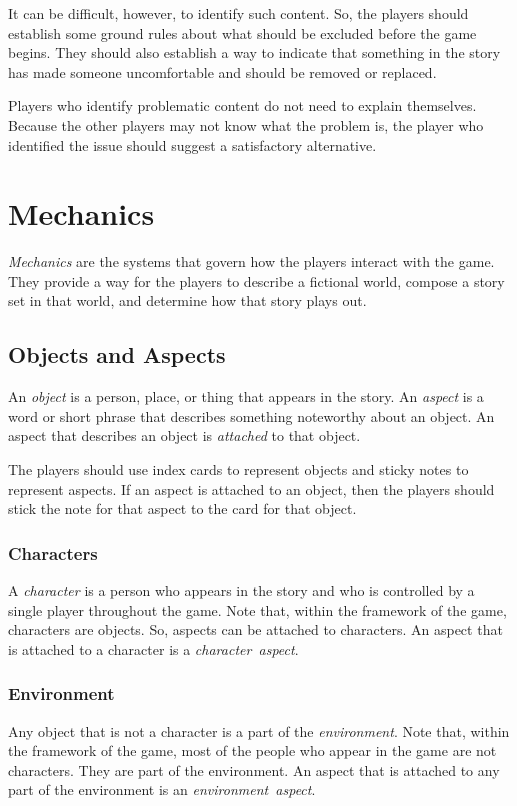 \documentclass[12pt, a5paper, parskip=half-, footheight=1.4cm]{scrartcl}
\begin{document}
It can be difficult, however,  to identify such content. 
So, the players should establish some ground rules about what should be excluded before the game begins. 
They should also establish a way to indicate that something in the story has made someone uncomfortable and should be removed or replaced.

Players who identify problematic content do not need to explain themselves.
Because the other players may not know what the problem is, the player who identified the issue should suggest a satisfactory alternative.

\newpage

\section*{Mechanics}  \label{section:mechanics}
\emph{Mechanics} are the systems that govern how the players interact with the game.
They provide a way for the players to describe a fictional world, compose a story set in that world, and determine how that story plays out.

\subsection*{Objects and Aspects} \label{subsection:objects-and-aspects}
An \emph{object} is a person, place, or thing that appears in the story.
An \emph{aspect} is a word or short phrase that describes something noteworthy about an object.
An aspect that describes an object is \emph{attached} to that object.

The players should use index cards to represent objects and sticky notes to represent aspects. 
If an aspect is attached to an object, then the players should stick the note for that aspect to the card for that object.

\subsubsection*{Characters} \label{subsubsection:characters}
A \emph{character} is a person who appears in the story and who  is controlled by a single player throughout the game. 
Note that, within the framework of the game, characters are objects.
So, aspects can be attached to characters.
An aspect that is attached to a character is a \emph{character~aspect}.

\subsubsection*{Environment} \label{subsubsectioon:environment}
Any object that is not a character is a part of the \emph{environment}.
Note that, within the framework of the game, most of the people who appear in the game are not characters.
They are part of the environment. 
An aspect that is attached to any part of the environment is an \emph{environment~aspect}.
\end{document}
